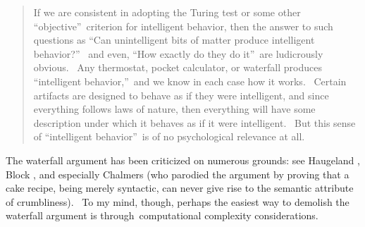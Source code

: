 \documentclass[12pt,onecolumn]{article}%
\begin{document}
\begin{quotation}
\noindent If we are consistent in adopting the Turing test or some other
\textquotedblleft objective\textquotedblright\ criterion for intelligent
behavior, then the answer to such questions as \textquotedblleft Can
unintelligent bits of matter produce intelligent behavior?\textquotedblright%
\ and even, \textquotedblleft How exactly do they do it\textquotedblright\ are
ludicrously obvious. \ Any thermostat, pocket calculator, or waterfall
produces \textquotedblleft intelligent behavior,\textquotedblright\ and we
know in each case how it works. \ Certain artifacts are designed to behave as
if they were intelligent, and since everything follows laws of nature, then
everything will have some description under which it behaves as if it were
intelligent. \ But this sense of \textquotedblleft intelligent
behavior\textquotedblright\ is of no psychological relevance at all.
\end{quotation}

The waterfall argument has been criticized on numerous grounds: see Haugeland
\cite{haugeland}, Block \cite{block}, and especially Chalmers \cite{chalmers}
(who parodied the argument by proving that a cake recipe, being merely
syntactic, can never give rise to the semantic attribute of crumbliness). \ To
my mind, though, perhaps the easiest way to demolish the waterfall argument is
through\ computational complexity considerations.
\end{document}
